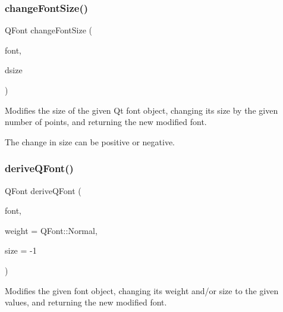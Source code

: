 \subsubsection{\texorpdfstring{change\+Font\+Size()}{changeFontSize()}\hspace{0.1cm}{\footnotesize\ttfamily [2/2]}}
{\footnotesize\ttfamily Q\+Font change\+Font\+Size (\begin{DoxyParamCaption}\item[{const Q\+Font \&}]{font,  }\item[{int}]{dsize }\end{DoxyParamCaption})\hspace{0.3cm}{\ttfamily [static]}}



Modifies the size of the given Qt font object, changing its size by the given number of points, and returning the new modified font. 

The change in size can be positive or negative. \mbox{\label{classGFont_ac36fbf8f4ebf4558559f98d54277529f}} 
\subsubsection{\texorpdfstring{derive\+Q\+Font()}{deriveQFont()}\hspace{0.1cm}{\footnotesize\ttfamily [1/4]}}
{\footnotesize\ttfamily Q\+Font derive\+Q\+Font (\begin{DoxyParamCaption}\item[{const Q\+Font \&}]{font,  }\item[{Q\+Font\+::\+Weight}]{weight = {\ttfamily QFont\+:\+:Normal},  }\item[{int}]{size = {\ttfamily -\/1} }\end{DoxyParamCaption})\hspace{0.3cm}{\ttfamily [static]}}



Modifies the given font object, changing its weight and/or size to the given values, and returning the new modified font. 

\mbox{\label{classGFont_aa0a91decdb8d9bec6e875ebac9d81c97}} 
